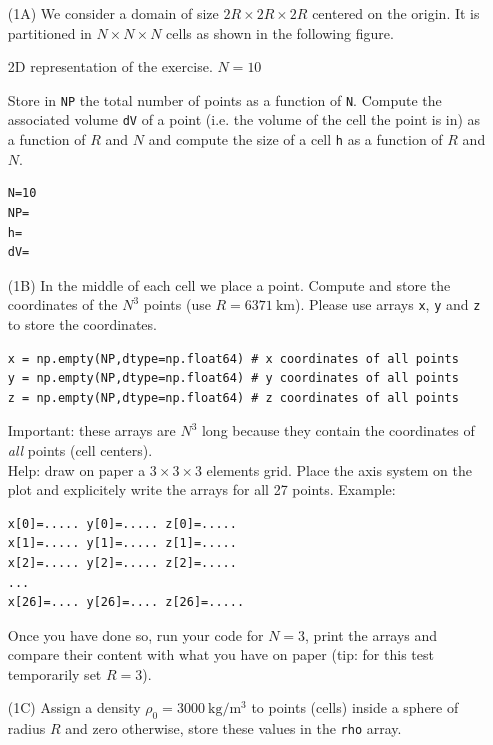 \begin{itemize}
\item[(1A)] We consider a domain of size $2R\times 2R \times 2R$ centered on the origin. It is 
partitioned in $N\times N \times N$ cells as shown in the following figure.

\begin{center}

{\captionfont 2D representation of the exercise. $N=10$}
\end{center}


Store in {\tt NP} the total number of points as a function of {\tt N}.
Compute the associated volume {\tt dV} of a point (i.e. the volume of the cell the point is in) 
as a function of $R$ and $N$ and  
compute the size of a cell {\tt h} as a function of $R$ and $N$. 
\begin{lstlisting}
N=10
NP=
h=
dV=
\end{lstlisting}

\item[(1B)] 
In the middle of each cell we place a point. Compute and store the coordinates 
of the $N^3$ points (use $R=6371~\si{\kilo\metre}$). Please use 
arrays {\tt x}, {\tt y} and {\tt z} to store the coordinates.
\begin{lstlisting}
x = np.empty(NP,dtype=np.float64) # x coordinates of all points
y = np.empty(NP,dtype=np.float64) # y coordinates of all points
z = np.empty(NP,dtype=np.float64) # z coordinates of all points
\end{lstlisting}

Important: these arrays are $N^3$ long because they contain the coordinates 
of {\it all} points (cell centers).\\
Help: draw on paper a $3\times3\times3$ elements grid. Place the axis system on the plot and explicitely write the arrays 
for all 27 points. Example:
\begin{verbatim}
x[0]=..... y[0]=..... z[0]=.....
x[1]=..... y[1]=..... z[1]=.....
x[2]=..... y[2]=..... z[2]=.....
...
x[26]=.... y[26]=.... z[26]=.....
\end{verbatim}
Once you have done so, run your code for $N=3$, print the arrays and 
compare their content with what you 
have on paper (tip: for this test temporarily set $R=3$).


\item[(1C)] Assign a density $\rho_0=3000~\si{\kilo\gram\per\cubic\metre}$ to points (cells) 
inside a sphere of radius $R$ and zero otherwise, store these values in the {\tt rho} array.


\end{itemize}
